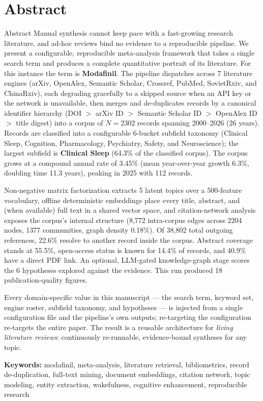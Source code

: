 \documentclass[
  ignorenonframetext,
]{beamer}
\author{\texorpdfstring{}{}}
\date{}
\begin{document}
\section{Abstract}\label{abstract}

\begin{frame}[allowframebreaks]{Abstract}
Manual synthesis cannot keep pace with a fast-growing research
literature, and ad-hoc reviews bind no evidence to a reproducible
pipeline. We present a configurable, reproducible meta-analysis
framework that takes a single search term and produces a complete
quantitative portrait of its literature. For this instance the term is
\textbf{Modafinil}. The pipeline dispatches across 7 literature engines
(arXiv, OpenAlex, Semantic Scholar, Crossref, PubMed, SovietRxiv, and
ChinaRxiv), each degrading gracefully to a skipped source when an API
key or the network is unavailable, then merges and de-duplicates records
by a canonical identifier hierarchy (DOI \(>\) arXiv ID \(>\) Semantic
Scholar ID \(>\) OpenAlex ID \(>\) title digest) into a corpus of
\(N = 2302\) records spanning 2000--2026 (26 years). Records are
classified into a configurable 6-bucket subfield taxonomy (Clinical
Sleep, Cognition, Pharmacology, Psychiatry, Safety, and Neuroscience);
the largest subfield is \textbf{Clinical Sleep} (64.3\% of the
classified corpus). The corpus grows at a compound annual rate of 3.45\%
(mean year-over-year growth 6.3\%, doubling time 11.3 years), peaking in
2025 with 112 records.

Non-negative matrix factorization extracts 5 latent topics over a
500-feature vocabulary, offline deterministic embeddings place every
title, abstract, and (when available) full text in a shared vector
space, and citation-network analysis exposes the corpus's internal
structure (8,772 intra-corpus edges across 2204 nodes, 1377 communities,
graph density 0.18\%). Of 38,802 total outgoing references, 22.6\%
resolve to another record inside the corpus. Abstract coverage stands at
55.5\%, open-access status is known for 14.4\% of records, and 40.9\%
have a direct PDF link. An optional, LLM-gated knowledge-graph stage
scores the 6 hypotheses explored against the evidence. This run produced
18 publication-quality figures.

Every domain-specific value in this manuscript --- the search term,
keyword set, engine roster, subfield taxonomy, and hypotheses --- is
injected from a single configuration file and the pipeline's own
outputs; re-targeting the configuration re-targets the entire paper. The
result is a reusable architecture for \emph{living literature reviews}:
continuously re-runnable, evidence-bound syntheses for any topic.

\textbf{Keywords:} modafinil, meta-analysis, literature retrieval,
bibliometrics, record de-duplication, full-text mining, document
embeddings, citation network, topic modeling, entity extraction,
wakefulness, cognitive enhancement, reproducible research
\end{frame}
\end{document}
